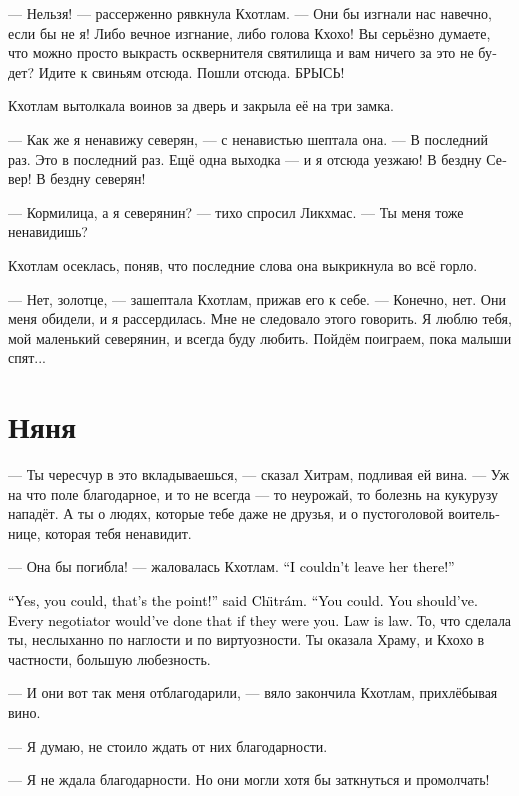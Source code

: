 \documentclass[a4paper,12pt,fleqn]{book}\usepackage{cooltooltips}\usepackage{polyglossia}\setdefaultlanguage{russian}\setotherlanguage{english}\defaultfontfeatures{Ligatures=TeX,Mapping=tex-text} \usepackage{xcolor}\definecolor{lightgray}{HTML}{bbbbbb}\color{lightgray}\newcommand{\ml}[3]{\textenglish{\textcolor{black}{#3}}}
\newcommand{\Chitram}{Ch\"{\i}tr\'{a}m}
\begin{document}
--- Нельзя! --- рассерженно рявкнула Кхотлам.
--- Они бы изгнали нас навечно, если бы не я!
Либо вечное изгнание, либо голова Кхохо!
Вы серьёзно думаете, что можно просто выкрасть осквернителя святилища и вам ничего за это не будет?
Идите к свиньям отсюда.
Пошли отсюда.
БРЫСЬ!

Кхотлам вытолкала воинов за дверь и закрыла её на три замка.

--- Как же я ненавижу северян, --- с ненавистью шептала она.
--- В последний раз.
Это в последний раз.
Ещё одна выходка --- и я отсюда уезжаю!
В бездну Север!
В бездну северян!

--- Кормилица, а я северянин? --- тихо спросил Ликхмас.
--- Ты меня тоже ненавидишь?

Кхотлам осеклась, поняв, что последние слова она выкрикнула во всё горло.

--- Нет, золотце, --- зашептала Кхотлам, прижав его к себе.
--- Конечно, нет.
Они меня обидели, и я рассердилась.
Мне не следовало этого говорить.
Я люблю тебя, мой маленький северянин, и всегда буду любить.
Пойдём поиграем, пока малыши спят...

\section{Няня}

--- Ты чересчур в это вкладываешься, --- сказал Хитрам, подливая ей вина.
--- Уж на что поле благодарное, и то не всегда --- то неурожай, то болезнь на кукурузу нападёт.
А ты о людях, которые тебе даже не друзья, и о пустоголовой воительнице, которая тебя ненавидит.

--- Она бы погибла! --- жаловалась Кхотлам.
\ml{$0$}
{--- Не могла же я её оставить там!}
{``I couldn't leave her there!''}

\ml{$0$}
{--- Да в том-то и дело, что могла! --- возразил Хитрам.}
{``Yes, you could, that's the point!'' said \Chitram.}
\ml{$0$}
{--- Могла.}
{``You could.}
\ml{$0$}
{Должна была.}
{You should've.}
\ml{$0$}
{Так бы сделал любой дипломат на твоём месте.}
{Every negotiator would've done that if they were you.}
\ml{$0$}
{Закон есть закон.}
{Law is law.}
То, что сделала ты, неслыханно по наглости и по виртуозности.
Ты оказала Храму, и Кхохо в частности, большую любезность.

--- И они вот так меня отблагодарили, --- вяло закончила Кхотлам, прихлёбывая вино.

--- Я думаю, не стоило ждать от них благодарности.

--- Я не ждала благодарности.
Но они могли хотя бы заткнуться и промолчать!
\end{document}

